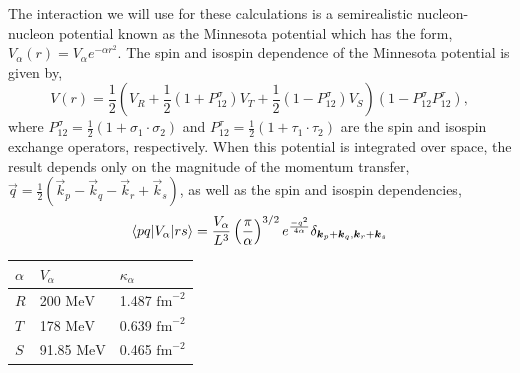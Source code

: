 The interaction we will use for these calculations is a semirealistic nucleon-nucleon potential known as the Minnesota potential which has the form, $V_{\alpha}\left( r\right)=V_{\alpha}e^{-\alpha r^{2}}$. The spin and isospin dependence of the Minnesota potential is given by,
\begin{equation}
V\left( r\right)=\frac{1}{2}\left( V_{R}+\frac{1}{2}\left( 1+P_{12}^{\sigma}\right) V_{T}+\frac{1}{2}\left( 1-P_{12}^{\sigma}\right) V_{S}\right)\left( 1-P_{12}^{\sigma}P_{12}^{\tau}\right),
\end{equation}
where $P_{12}^{\sigma}=\frac{1}{2}\left( 1+\sigma_{1}\cdot\sigma_{2}\right)$ and $P_{12}^{\tau}=\frac{1}{2}\left( 1+\tau_{1}\cdot\tau_{2}\right)$ are the spin and isospin exchange operators, respectively. When this potential is integrated over space, the result depends only on the magnitude of the momentum transfer, $\vec{q}=\frac{1}{2}\left(\vec{k}_{p}-\vec{k}_{q}-\vec{k}_{r}+\vec{k}_{s}\right)$, as well as the spin and isospin dependencies,
\begin{equation}
\braket{pq| V_{\alpha} |rs}=\frac{V_{\alpha}}{L^{3}}\left(\frac{\pi}{\alpha}\right)^{3/2}e^{\frac{-q^{2}}{4\alpha}}\delta_{\vec{k}_{p}+\vec{k}_{q},\vec{k}_{r}+\vec{k}_{s}}
\end{equation}
\begin{center}
  \begin{tabular}{| l | l | l |}
    \hline
    $\alpha$ & $V_{\alpha}$ & $\kappa_{\alpha}$ \\ \hline
    $R$ & 200 $\mathrm{MeV}$ & 1.487 $\mathrm{fm}^{-2}$ \\ \hline
    $T$ & 178 $\mathrm{MeV}$ & 0.639 $\mathrm{fm}^{-2}$ \\ \hline
    $S$ & 91.85 $\mathrm{MeV}$ & 0.465 $\mathrm{fm}^{-2}$ \\ \hline
  \end{tabular}
\end{center}

